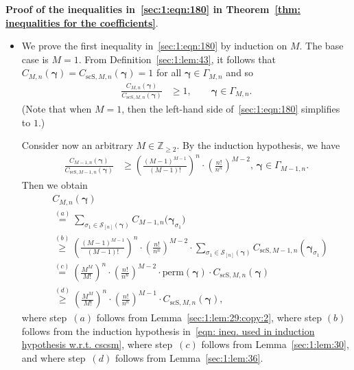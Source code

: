 \documentclass[journal,lettersize,twocolumn]{IEEEtran} %
\newcommand{\vect}[1]{ \bm{#1} }
\newcommand{\set}[1]{\mathcal{#1}}
\newcommand{\vgam}{ \vect{\gamma} }
\newcommand{\sZ}{\mathbb{Z}}
\newcommand{\perm}{ \mathrm{perm} }
\newcommand{\setS}{\set{S}}
\newcommand{\CM}[1]{\Cgen{M}{#1}}
\newcommand{\Cgen}[2]{C_{#1,#2}}
\newcommand{\CscSgen}[2]{C_{\mathrm{scS},#1,#2}}
\begin{document}
%

\noindent
\textbf{Proof of the inequalities in~\eqref{sec:1:eqn:180} in Theorem~\ref{thm:
    inequalities for the coefficients}}.
\begin{itemize}

\item We prove the first inequality in~\eqref{sec:1:eqn:180} by induction on
  $M$. The base case is $M = 1$. From Definition~\ref{sec:1:lem:43}, it
  follows that $\CM{n}(\vgam) = \CscSgen{M}{n}(\vgam) = 1$ for all
  $\vgam \in \Gamma_{M,n}$ and so
  \begin{align*}
    \frac{\CM{n}(\vgam)}
         {\CscSgen{M}{n}(\vgam)}
      &\geq
         1, 
           \qquad \vgam \in \Gamma_{M,n}.
  \end{align*}
  (Note that when $M = 1$, then the left-hand side of~\eqref{sec:1:eqn:180}
  simplifies to $1$.)

  Consider now an arbitrary $ M \in \sZ_{\geq 2} $. By the induction
  hypothesis, we have
  \begin{align}
    \frac{\Cgen{M-1}{n}(\vgam)}
         {\CscSgen{M-1}{n}(\vgam)} 
      &\! \geq \!
         \left( \!
           \frac{(M \! - \! 1)^{M-1}}
                {(M \! - \! 1)!} \!
         \right)^{\!\!\! n} \!\!
         \cdot \!
         \left(
           \frac{ n! }
                { n^{n} }
         \right)^{\!\! M-2} \!\!\!\! ,
           \, \vgam \in \Gamma_{M-1,n}.
             \label{eqn: ineq. used in induction hypothesis w.r.t. cscsm}
  \end{align}
  Then we obtain
  \begin{align*}
    &\CM{n}( \vgam ) \nonumber \\
    &\overset{(a)}{=}
       \sum_{\sigma_1 \in \setS_{[n]}( \vgam )}
         \Cgen{M-1}{n}
           \bigl( 
             \vgam_{\sigma_1}
           \bigr) 
             \nonumber \\
    &\overset{(b)}{\geq}
       \left( \frac{(M \! - \! 1)^{M-1}}{(M \! - \! 1)!} \right)^{\!\! n}
       \cdot
       \left(
         \frac{ n! }{ n^{n} }
       \right)^{\!\! M-2} 
       \!\!\!\!\!\!
       \cdot
       \sum_{\sigma_1 \in \setS_{[n]}( \vgam )} \!\!
         \CscSgen{M-1}{n}(\vgam_{\sigma_1})
           \nonumber \\ 
    &\overset{(c)}{=} 
       \left( \frac{M^{M}}{M!} \right)^{\!\! n}
       \cdot
       \left(
         \frac{ n! }{ n^{n} }
       \right)^{\!\! M-2} 
       \cdot
       \perm(\vgam)
       \cdot
       \CscSgen{M}{n}(\vgam)
         \nonumber \\
    &\overset{(d)}{\geq}
       \left( \frac{M^{M}}{M!} \right)^{\!\! n}
       \cdot
       \left(
         \frac{ n! }{ n^{n} }
       \right)^{\!\! M-1} 
       \cdot 
       \CscSgen{M}{n}(\vgam),
  \end{align*}
  where step~$(a)$ follows from Lemma~\ref{sec:1:lem:29:copy:2}, where step
  $(b)$ follows from the induction hypothesis in~\eqref{eqn: ineq. used in
    induction hypothesis w.r.t. cscsm}, where step~$(c)$ follows from
  Lemma~\ref{sec:1:lem:30}, and where step~$(d)$ follows from
  Lemma~\ref{sec:1:lem:36}.


\end{itemize}
\end{document}

